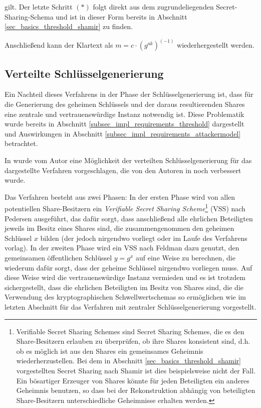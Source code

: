 gilt. Der letzte Schritt \((*)\) folgt direkt aus dem zugrundeliegenden Secret-Sharing-Schema und ist in dieser Form bereits in Abschnitt \ref{sec_basics_threshold_shamir} zu finden.

Anschließend kann der Klartext als \(m = c \cdot (g^{ak})^{(-1)}\) wiederhergestellt werden. 

\subsection{Verteilte Schlüsselgenerierung}

\label{sec_state_threshold_distributed}

Ein Nachteil dieses Verfahrens in der Phase der Schlüsselgenerierung ist, dass für die Generierung des geheimen Schlüssels und der daraus resultierenden Shares eine zentrale und vertrauenswürdige Instanz notwendig ist. Diese Problematik wurde bereits in Abschnitt \ref{subsec_impl_requirements_threshold} dargestellt und Auswirkungen in Abschnitt \ref{subsec_impl_requirements_attackermodel} betrachtet.

In \cite{pedersen1991} wurde vom Autor eine Möglichkeit der verteilten Schlüsselgenerierung für das dargestellte Verfahren vorgeschlagen, die von den Autoren in \cite{gennaro1999} noch verbessert wurde. 

Das Verfahren besteht aus zwei Phasen: In der ersten Phase wird von allen potentiellen Share-Besitzern ein \textit{Verifiable Secret Sharing Scheme}\footnote{
  Verifiable Secret Sharing Schemes sind Secret Sharing Schemes, die es den Share-Besitzern erlauben zu überprüfen, ob ihre Shares konsistent sind, d.h. ob es möglich ist aus den Shares ein gemeinsames Geheimnis wiederherzustellen. Bei dem in Abschnitt \ref{sec_basics_threshold_shamir} vorgestellten Secret Sharing nach Shamir ist dies beispielsweise nicht der Fall. Ein bösartiger Erzeuger von Shares könnte für jeden Beteiligten ein anderes Geheimnis benutzen, so dass bei der Rekonstruktion abhängig von beteiligten Share-Besitzern unterschiedliche Geheimnisse erhalten werden.
} (VSS) nach Pedersen ausgeführt, das dafür sorgt, dass anschließend alle ehrlichen Beteiligten jeweils im Besitz eines Shares sind, die zusammengenommen den geheimen Schlüssel \(x\) bilden (der jedoch nirgendwo vorliegt oder im Laufe des Verfahrens vorlag). In der zweiten Phase wird ein VSS nach Feldman dazu genutzt, den gemeinsamen öffentlichen Schlüssel \(y = g^x\) auf eine Weise zu berechnen, die wiederum dafür sorgt, dass der geheime Schlüssel nirgendwo vorliegen muss. Auf diese Weise wird die vertrauenswürdige Instanz vermieden und es ist trotzdem sichergestellt, dass die ehrlichen Beteiligten im Besitz von Shares sind, die die Verwendung des kryptographischen Schwellwertschemas so ermöglichen wie im letzten Abschnitt für das Verfahren mit zentraler Schlüsselgenerierung vorgestellt.

